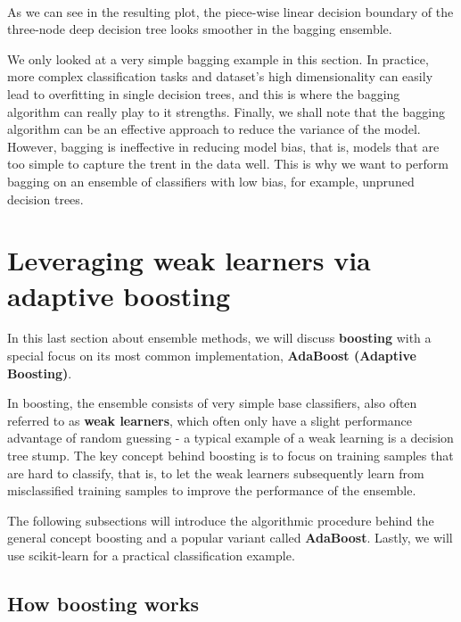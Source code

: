 \documentclass[11pt]{article}
\begin{document}
    \begin{center}
    \end{center}
    { \hspace*{\fill} \\}
    
    As we can see in the resulting plot, the piece-wise linear decision
boundary of the three-node deep decision tree looks smoother in the
bagging ensemble.

We only looked at a very simple bagging example in this section. In
practice, more complex classification tasks and dataset's high
dimensionality can easily lead to overfitting in single decision trees,
and this is where the bagging algorithm can really play to it strengths.
Finally, we shall note that the bagging algorithm can be an effective
approach to reduce the variance of the model. However, bagging is
ineffective in reducing model bias, that is, models that are too simple
to capture the trent in the data well. This is why we want to perform
bagging on an ensemble of classifiers with low bias, for example,
unpruned decision trees.

    \section{Leveraging weak learners via adaptive
boosting}\label{leveraging-weak-learners-via-adaptive-boosting}

    In this last section about ensemble methods, we will discuss
\textbf{boosting} with a special focus on its most common
implementation, \textbf{AdaBoost (Adaptive Boosting)}.

In boosting, the ensemble consists of very simple base classifiers, also
often referred to as \textbf{weak learners}, which often only have a
slight performance advantage of random guessing - a typical example of a
weak learning is a decision tree stump. The key concept behind boosting
is to focus on training samples that are hard to classify, that is, to
let the weak learners subsequently learn from misclassified training
samples to improve the performance of the ensemble.

The following subsections will introduce the algorithmic procedure
behind the general concept boosting and a popular variant called
\textbf{AdaBoost}. Lastly, we will use scikit-learn for a practical
classification example.

    \subsection{How boosting works}\label{how-boosting-works}
\end{document}
